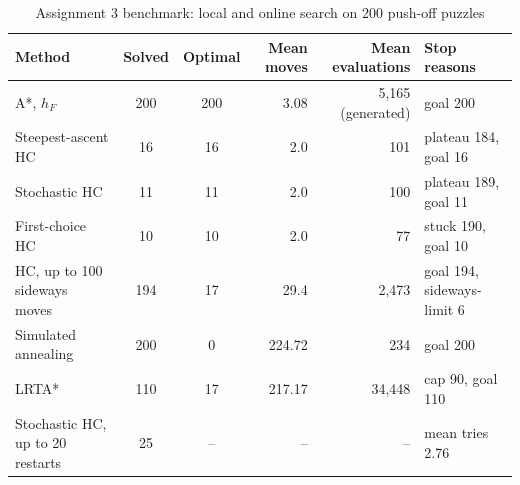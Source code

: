 \begin{table}[!htbp]
\centering\caption{Assignment 3 benchmark: local and online search on 200 push-off puzzles}\label{tab:a3}
\scriptsize
\begin{tabular}{@{}lccrrl@{}}
\toprule
Method & Solved & Optimal & Mean moves & Mean evaluations & Stop reasons \\
\midrule
A*, $h_F$ & 200 & 200 & 3.08 & 5,165 (generated) & goal 200 \\
Steepest-ascent HC & 16 & 16 & 2.0 & 101 & plateau 184, goal 16 \\
Stochastic HC & 11 & 11 & 2.0 & 100 & plateau 189, goal 11 \\
First-choice HC & 10 & 10 & 2.0 & 77 & stuck 190, goal 10 \\
HC, up to 100 sideways moves & 194 & 17 & 29.4 & 2,473 & goal 194, sideways-limit 6 \\
Simulated annealing & 200 & 0 & 224.72 & 234 & goal 200 \\
LRTA* & 110 & 17 & 217.17 & 34,448 & cap 90, goal 110 \\
Stochastic HC, up to 20 restarts & 25 & -- & -- & -- & mean tries 2.76 \\
\bottomrule
\end{tabular}
\par\vspace{2pt}{\scriptsize Steepest ascent stopped 184 times, all on plateaus: 167 shoulders, 0 flat minima, 0 strict local minima, 0 ridges, 17 not classified within 500 boards. Hill climbing on the Assignment~1 utility pushed a marble off in 47 of 200 puzzles. On the 106 puzzles solved by A*, sideways HC, annealing and LRTA*, the mean solution lengths are 2.96, 25.25, 218.12, 217.93.}
\end{table}
